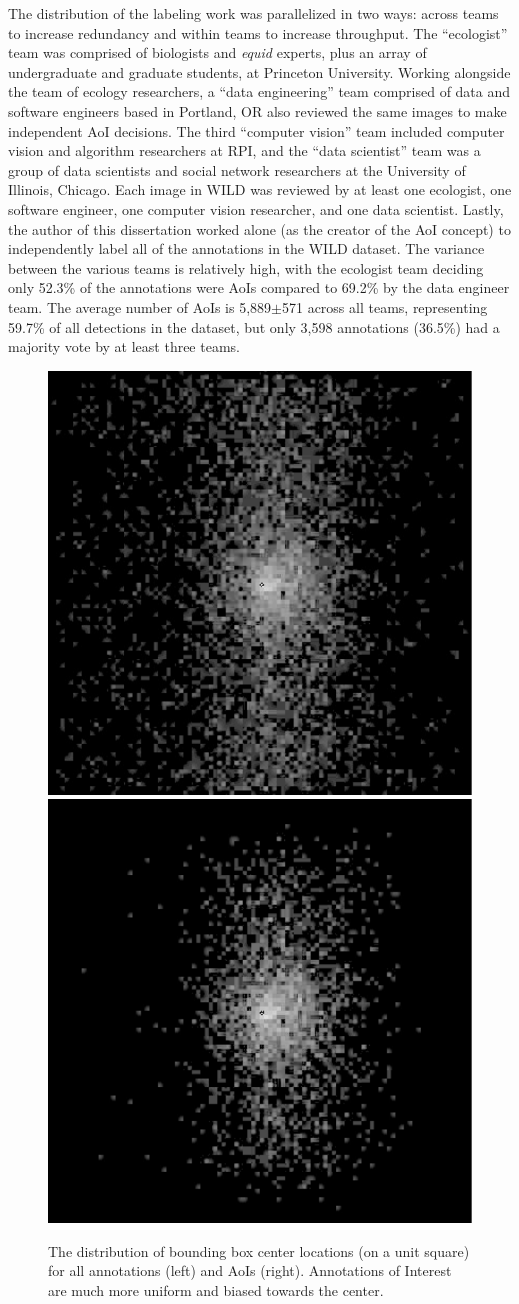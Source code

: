 The distribution of the labeling work was parallelized in two ways: across teams to increase redundancy and within teams to increase throughput.  The ``ecologist'' team was comprised of biologists and \textit{equid} experts, plus an array of undergraduate and graduate students, at Princeton University.  Working alongside the team of ecology researchers, a ``data engineering'' team comprised of data and software engineers based in Portland, OR also reviewed the same images to make independent AoI decisions.  The third ``computer vision'' team included computer vision and algorithm researchers at RPI, and the ``data scientist'' team was a group of data scientists and social network researchers at the University of Illinois, Chicago.  Each image in WILD was reviewed by at least one ecologist, one software engineer, one computer vision researcher, and one data scientist.  Lastly, the author of this dissertation worked alone (as the creator of the AoI concept) to independently label all of the annotations in the WILD dataset.  The variance between the various teams is relatively high, with the ecologist team deciding only 52.3\% of the annotations were AoIs compared to 69.2\% by the data engineer team. The average number of AoIs is 5,889$\pm$571 across all teams, representing 59.7\% of all detections in the dataset, but only 3,598 annotations (36.5\%) had a majority vote by at least three teams.

\begin{figure}[!t]
    \begin{center}
        \includegraphics[width=0.45\linewidth]{resources/centers-all-log2.pdf}
        \includegraphics[width=0.45\linewidth]{resources/centers-aoi-log2.pdf}
    \end{center}
    \caption{The distribution of bounding box center locations (on a unit square) for all annotations (left) and AoIs (right).  Annotations of Interest are much more uniform and biased towards the center.}
    \label{fig:ca-metrics-centers}
\end{figure}


